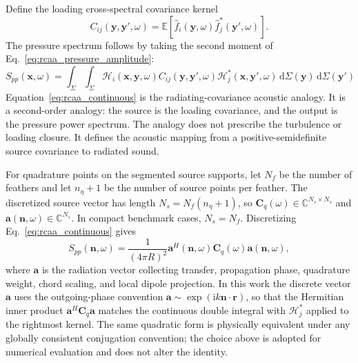 \documentclass[11pt]{article}
\newcommand{\dd}{\,\mathrm{d}}
\newcommand{\ii}{\mathrm{i}}
\newcommand{\vect}[1]{\bm{#1}}
\newcommand{\mat}[1]{\bm{#1}}
\newcommand{\E}{\mathbb{E}}
\begin{document}
Define the loading cross-spectral covariance kernel
\begin{equation}
    C_{ij}(\vect{y},\vect{y}',\omega)
    =
    \E\left[
        \hat f_i(\vect{y},\omega)
        \hat f_j^*(\vect{y}',\omega)
    \right].
\label{eq:continuous_source_covariance}
\end{equation}
The pressure spectrum follows by taking the second moment of Eq.~\ref{eq:rcaa_pressure_amplitude}:
\begin{equation}
\boxed{
    S_{pp}(\vect{x},\omega)
    =
    \int_{\Sigma}\int_{\Sigma}
    \mathcal H_i(\vect{x},\vect{y},\omega)
    C_{ij}(\vect{y},\vect{y}',\omega)
    \mathcal H_j^*(\vect{x},\vect{y}',\omega)
    \dd\Sigma(\vect{y})
    \dd\Sigma(\vect{y}')
}
\label{eq:rcaa_continuous}
\end{equation}
Equation~\ref{eq:rcaa_continuous} is the radiating-covariance acoustic analogy. It is a second-order analogy: the source is the loading covariance, and the output is the pressure power spectrum. The analogy does not prescribe the turbulence or loading closure. It defines the acoustic mapping from a positive-semidefinite source covariance to radiated sound.

For quadrature points on the segmented source supports, let $N_f$ be the number of feathers and let $n_\eta+1$ be the number of source points per feather. The discretized source vector has length $N_s=N_f(n_\eta+1)$, so $\mat{C}_q(\omega)\in\mathbb{C}^{N_s\times N_s}$ and $\vect{a}(\vect{n},\omega)\in\mathbb{C}^{N_s}$. In compact benchmark cases, $N_s=N_f$. Discretizing Eq.~\ref{eq:rcaa_continuous} gives
\begin{equation}
    S_{pp}(\vect{n},\omega)
    =
    \frac{1}{(4\pi R)^2}
    \vect{a}^{H}(\vect{n},\omega)
    \mat{C}_q(\omega)
    \vect{a}(\vect{n},\omega),
\label{eq:radiating_covariance_identity}
\end{equation}
where $\vect{a}$ is the radiation vector collecting transfer, propagation phase, quadrature weight, chord scaling, and local dipole projection. In this work the discrete vector $\vect{a}$ uses the outgoing-phase convention $\vect{a}\sim\exp(\ii k\vect{n}\cdot\vect{r})$, so that the Hermitian inner product $\vect{a}^{H}\mat{C}_q\vect{a}$ matches the continuous double integral with $\mathcal H_j^*$ applied to the rightmost kernel. The same quadratic form is physically equivalent under any globally consistent conjugation convention; the choice above is adopted for numerical evaluation and does not alter the identity.
\end{document}
